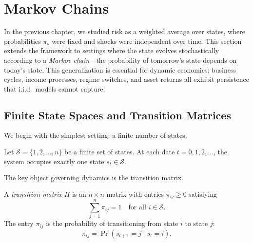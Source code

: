 
\section{Markov Chains}
\label{sec:markov-chains}

In the previous chapter, we studied risk as a weighted average over states, where probabilities $\pi_s$ were fixed and shocks were independent over time. This section extends the framework to settings where the state evolves stochastically according to a \emph{Markov chain}---the probability of tomorrow's state depends on today's state. This generalization is essential for dynamic economics: business cycles, income processes, regime switches, and asset returns all exhibit persistence that i.i.d.\ models cannot capture.

\subsection{Finite State Spaces and Transition Matrices}
\label{subsec:finite-state}

We begin with the simplest setting: a finite number of states.

\begin{definition}
\label{def:state-space}
Let $\mathcal{S} = \{1, 2, \ldots, n\}$ be a finite set of states. At each date $t = 0, 1, 2, \ldots$, the system occupies exactly one state $s_t \in \mathcal{S}$.
\end{definition}

The key object governing dynamics is the transition matrix.

\begin{definition}
\label{def:transition-matrix}
A \emph{transition matrix} $\Pi$ is an $n \times n$ matrix with entries $\pi_{ij} \geq 0$ satisfying
\begin{equation}
\sum_{j=1}^{n} \pi_{ij} = 1 \quad \text{for all } i \in \mathcal{S}.
\label{eq:row-stochastic}
\end{equation}
The entry $\pi_{ij}$ is the probability of transitioning from state $i$ to state $j$:
\begin{equation}
\pi_{ij} = \Pr(s_{t+1} = j \mid s_t = i).
\label{eq:transition-prob}
\end{equation}
\end{definition}

